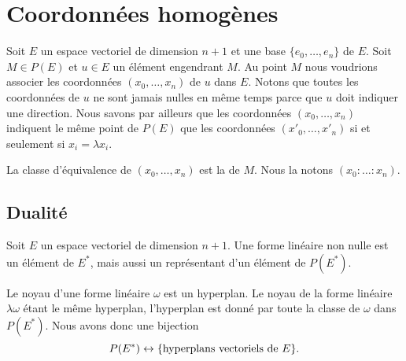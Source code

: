 \section{Coordonnées homogènes}

Soit \( E\) un espace vectoriel de dimension \( n+1\) et une base \( \{ e_0,\ldots, e_n \}\) de \( E\). Soit \( M\in P(E)\) et \( u\in E\) un élément engendrant \( M\). Au point \( M\) nous voudrions associer les coordonnées \( (x_0,\ldots, x_n)\) de \( u\) dans \( E\). Notons que toutes les coordonnées de \( u\) ne sont jamais nulles en même temps parce que \( u\) doit indiquer une direction. Nous savons par ailleurs que les coordonnées \( (x_0,\ldots, x_n)\) indiquent le même point de \( P(E)\) que les coordonnées \( (x'_0,\ldots, x'_n)\) si et seulement si \( x_i=\lambda x_i\).

\begin{definition}
    La classe d'équivalence de \( (x_0,\ldots, x_n)\) est la  de \( M\). Nous la notons \( (x_0:\ldots :x_n)\).
\end{definition}


\subsection{Dualité}

Soit \( E\) un espace vectoriel de dimension \( n+1\). Une forme linéaire non nulle est un élément de \( E^*\), mais aussi un représentant d'un élément de \( P(E^*)\).

Le noyau d'une forme linéaire \( \omega\) est un hyperplan. Le noyau de la forme linéaire \( \lambda\omega\) étant le même hyperplan, l'hyperplan est donné par toute la classe de \( \omega\) dans \( P(E^*)\). Nous avons donc une bijection
\begin{equation}
    P(E^*)\leftrightarrow \{ \text{hyperplans vectoriels de \( E\)} \}.
\end{equation}


